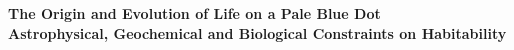\frontmatter %

\pagestyle{plain} %


\begin{titlepage}
\begin{center}

\vspace*{.02\textheight}



{\bfseries
\LARGE{The Origin and Evolution of Life on a Pale Blue Dot}\\
\bigskip
\large{Astrophysical, Geochemical and Biological Constraints on Habitability}
}

\vspace{1cm} %

 
\begin{minipage}[t]{0.3\textwidth}
\begin{center}
 \large
 \authorname %
\end{center}
\end{minipage}

 

\end{center}
\end{titlepage}
